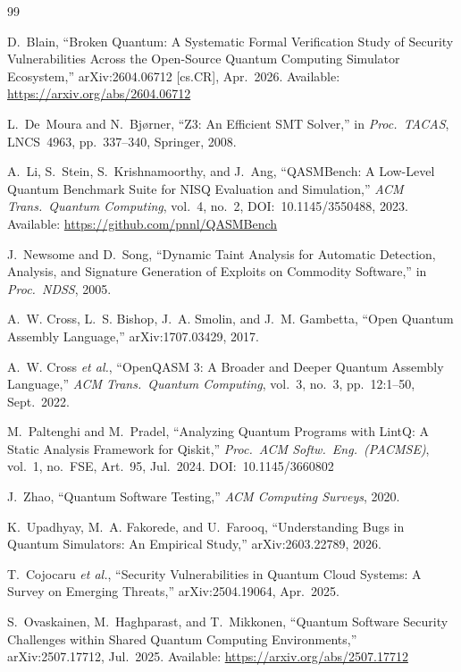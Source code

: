 \documentclass[conference,compsoc]{IEEEtran}
\begin{document}
\balance

\begin{thebibliography}{99}

D.~Blain,
``{Broken Quantum: A Systematic Formal Verification Study of Security
Vulnerabilities Across the Open-Source Quantum Computing Simulator
Ecosystem},''
arXiv:2604.06712 [cs.CR], Apr.\ 2026.
Available: \url{https://arxiv.org/abs/2604.06712}

L.~De~Moura and N.~Bj{\o}rner,
``{Z3: An Efficient SMT Solver},''
in \textit{Proc.\ TACAS}, LNCS~4963, pp.~337--340, Springer, 2008.

A.~Li, S.~Stein, S.~Krishnamoorthy, and J.~Ang,
``{QASMBench: A Low-Level Quantum Benchmark Suite for NISQ Evaluation
and Simulation},''
\textit{ACM Trans.\ Quantum Computing}, vol.~4, no.~2,
DOI:~10.1145/3550488, 2023.
Available: \url{https://github.com/pnnl/QASMBench}

J.~Newsome and D.~Song,
``{Dynamic Taint Analysis for Automatic Detection, Analysis, and
Signature Generation of Exploits on Commodity Software},''
in \textit{Proc.\ NDSS}, 2005.

A.~W. Cross, L.~S. Bishop, J.~A. Smolin, and J.~M. Gambetta,
``{Open Quantum Assembly Language},''
arXiv:1707.03429, 2017.

A.~W. Cross \textit{et al.},
``{OpenQASM 3: A Broader and Deeper Quantum Assembly Language},''
\textit{ACM Trans.\ Quantum Computing}, vol.~3, no.~3,
pp.~12:1--50, Sept.\ 2022.

M.~Paltenghi and M.~Pradel,
``{Analyzing Quantum Programs with LintQ: A Static Analysis Framework
for Qiskit},''
\textit{Proc.\ ACM Softw.\ Eng.\ (PACMSE)}, vol.~1, no.~FSE, Art.~95,
Jul.\ 2024. DOI:~10.1145/3660802

J.~Zhao,
``{Quantum Software Testing},''
\textit{ACM Computing Surveys}, 2020.

K.~Upadhyay, M.~A. Fakorede, and U.~Farooq,
``{Understanding Bugs in Quantum Simulators: An Empirical Study},''
arXiv:2603.22789, 2026.

T.~Cojocaru \textit{et al.},
``{Security Vulnerabilities in Quantum Cloud Systems: A Survey on
Emerging Threats},''
arXiv:2504.19064, Apr.\ 2025.

S.~Ovaskainen, M.~Haghparast, and T.~Mikkonen,
``{Quantum Software Security Challenges within Shared Quantum
Computing Environments},''
arXiv:2507.17712, Jul.\ 2025.
Available: \url{https://arxiv.org/abs/2507.17712}


\end{thebibliography}
\end{document}
